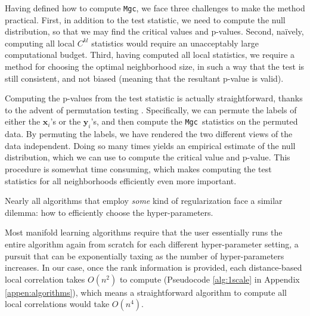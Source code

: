 \documentclass[11pt]{article}
\newcommand{\note}[2][]{\added[#1,remark={#2}]{}}
\providecommand{\sct}[1]{{\sc \texttt{#1}}}
\providecommand{\mb}[1]{\boldsymbol{#1}}
\providecommand{\mc}[1]{\mathcal{#1}}
\newcommand{\G}{C}
\newcommand{\Mgc}{\sct{Mgc}}
\newcommand{\jv}[1]{{\note{jv: #1}}}
\newcommand{\mbx}{\ensuremath{\mb{x}}}
\newcommand{\mby}{\ensuremath{\mb{y}}}
\begin{document}
Having defined how to compute \Mgc, we face three challenges to make the method practical. First, in addition to the test statistic, we need to compute the null distribution, so that we may find the critical values and p-values.
Second, na\"ively, computing all local $\G^{kl}$ statistics would require an unacceptably large computational budget.
Third, having computed all local statistics, we require a method for choosing the optimal neighborhood size, in such a way that the test is still consistent, and not biased (meaning that the resultant p-value is valid).

Computing the p-values from the test statistic is actually straightforward, thanks to the advent of permutation testing \cite{GoodPermutationBook}.  Specifically, we can permute the labels of either the $\mbx_i$'s or the $\mby_i$'s, and then compute the \Mgc~statistics on the permuted data.  By permuting the labels, we have rendered the two different views of the data independent.  Doing so many times yields an empirical estimate of the null distribution, which we can use to compute the critical value and p-value. This procedure is somewhat time consuming, which makes computing the test statistics for all neighborhoods efficiently even more important.



Nearly all algorithms that employ \emph{some} kind of regularization face a similar dilemma: how to efficiently choose the hyper-parameters.

\jv{Need to discuss the last two paragraphs in this section; and I have combined two running time paragraph into one.}
Most manifold learning algorithms require that the user essentially runs the entire algorithm again from scratch for each different hyper-parameter setting, a pursuit that can be exponentially taxing as the number of hyper-parameters increases.
In our case, once the rank information is provided, each distance-based local correlation takes $O(n^2)$ to compute (Pseudocode \ref{alg:1scale} in Appendix \ref{appen:algorithms}), which means a straightforward algorithm to compute all local correlations would take $O(n^4)$.
\end{document}

